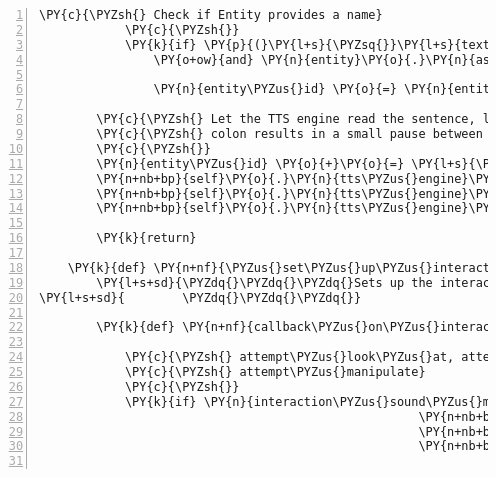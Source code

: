 \begin{Verbatim}[commandchars=\\\{\},numbers=left,firstnumber=1,stepnumber=1]
            \PY{c}{\PYZsh{} Check if Entity provides a name}
            \PY{c}{\PYZsh{}}
            \PY{k}{if} \PY{p}{(}\PY{l+s}{\PYZsq{}}\PY{l+s}{text/plain}\PY{l+s}{\PYZsq{}} \PY{o+ow}{in} \PY{n}{entity}\PY{o}{.}\PY{n}{assets}\PY{o}{.}\PY{n}{keys}\PY{p}{(}\PY{p}{)}
                \PY{o+ow}{and} \PY{n}{entity}\PY{o}{.}\PY{n}{assets}\PY{p}{[}\PY{l+s}{\PYZsq{}}\PY{l+s}{text/plain}\PY{l+s}{\PYZsq{}}\PY{p}{]}\PY{o}{.}\PY{n}{data} \PY{o+ow}{is} \PY{o+ow}{not} \PY{n+nb+bp}{None}\PY{p}{)}\PY{p}{:}

                \PY{n}{entity\PYZus{}id} \PY{o}{=} \PY{n}{entity}\PY{o}{.}\PY{n}{assets}\PY{p}{[}\PY{l+s}{\PYZsq{}}\PY{l+s}{text/plain}\PY{l+s}{\PYZsq{}}\PY{p}{]}\PY{o}{.}\PY{n}{data}\PY{p}{[}\PY{l+m+mi}{0}\PY{p}{]}

        \PY{c}{\PYZsh{} Let the TTS engine read the sentence, lead by the speakers name, the}
        \PY{c}{\PYZsh{} colon results in a small pause between identifier and text}
        \PY{c}{\PYZsh{}}
        \PY{n}{entity\PYZus{}id} \PY{o}{+}\PY{o}{=} \PY{l+s}{\PYZdq{}}\PY{l+s}{: }\PY{l+s}{\PYZdq{}}
        \PY{n+nb+bp}{self}\PY{o}{.}\PY{n}{tts\PYZus{}engine}\PY{o}{.}\PY{n}{say}\PY{p}{(}\PY{n}{entity\PYZus{}id}\PY{p}{,} \PY{l+s}{\PYZsq{}}\PY{l+s}{\PYZob{}\PYZcb{}}\PY{l+s}{\PYZsq{}}\PY{o}{.}\PY{n}{format}\PY{p}{(}\PY{n}{entity\PYZus{}id}\PY{p}{)}\PY{p}{)}
        \PY{n+nb+bp}{self}\PY{o}{.}\PY{n}{tts\PYZus{}engine}\PY{o}{.}\PY{n}{say}\PY{p}{(}\PY{n}{event}\PY{o}{.}\PY{n}{text}\PY{p}{,} \PY{l+s}{\PYZsq{}}\PY{l+s}{SaysEvent}\PY{l+s}{\PYZsq{}}\PY{p}{)}
        \PY{n+nb+bp}{self}\PY{o}{.}\PY{n}{tts\PYZus{}engine}\PY{o}{.}\PY{n}{runAndWait}\PY{p}{(}\PY{p}{)}

        \PY{k}{return}

    \PY{k}{def} \PY{n+nf}{\PYZus{}set\PYZus{}up\PYZus{}interaction\PYZus{}menu}\PY{p}{(}\PY{n+nb+bp}{self}\PY{p}{)}\PY{p}{:}
        \PY{l+s+sd}{\PYZdq{}\PYZdq{}\PYZdq{}Sets up the interaction menu list.}
\PY{l+s+sd}{        \PYZdq{}\PYZdq{}\PYZdq{}}

        \PY{k}{def} \PY{n+nf}{callback\PYZus{}on\PYZus{}interaction\PYZus{}selected}\PY{p}{(}\PY{n}{interaction\PYZus{}sound\PYZus{}menu}\PY{p}{)}\PY{p}{:}

            \PY{c}{\PYZsh{} attempt\PYZus{}look\PYZus{}at, attempt\PYZus{}talk\PYZus{}to, attempt\PYZus{}pick\PYZus{}up and}
            \PY{c}{\PYZsh{} attempt\PYZus{}manipulate}
            \PY{c}{\PYZsh{}}
            \PY{k}{if} \PY{n}{interaction\PYZus{}sound\PYZus{}menu}\PY{o}{.}\PY{n}{list\PYZus{}index} \PY{o+ow}{in} \PY{p}{(}\PY{n+nb+bp}{self}\PY{o}{.}\PY{n}{ATTEMPT\PYZus{}LOOK\PYZus{}AT}\PY{p}{,}
                                                     \PY{n+nb+bp}{self}\PY{o}{.}\PY{n}{ATTEMPT\PYZus{}TALK\PYZus{}TO}\PY{p}{,}
                                                     \PY{n+nb+bp}{self}\PY{o}{.}\PY{n}{ATTEMPT\PYZus{}PICK\PYZus{}UP}\PY{p}{,}
                                                     \PY{n+nb+bp}{self}\PY{o}{.}\PY{n}{ATTEMPT\PYZus{}MANIPULATE}\PY{p}{)}\PY{p}{:}


\end{Verbatim}
